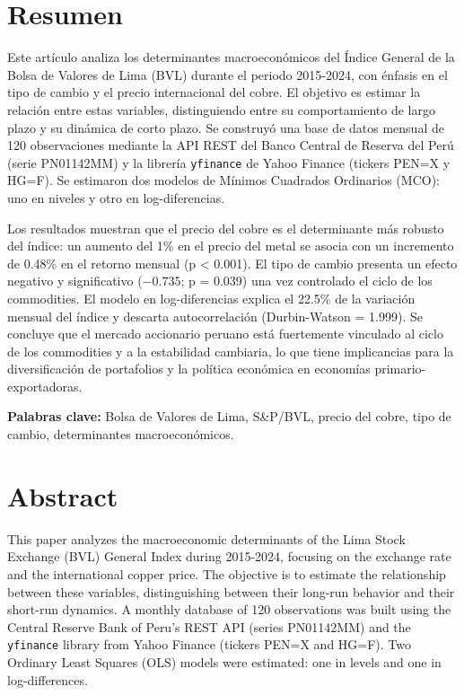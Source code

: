 \documentclass[12pt, a4paper]{article}
\begin{document}
\newpage
\section*{Resumen}

\noindent
Este artículo analiza los determinantes macroeconómicos del Índice General de la Bolsa de Valores de Lima (BVL) durante el periodo 2015-2024, con énfasis en el tipo de cambio y el precio internacional del cobre. El objetivo es estimar la relación entre estas variables, distinguiendo entre su comportamiento de largo plazo y su dinámica de corto plazo. Se construyó una base de datos mensual de 120 observaciones mediante la API REST del Banco Central de Reserva del Perú (serie PN01142MM) y la librería \texttt{yfinance} de Yahoo Finance (tickers PEN=X y HG=F). Se estimaron dos modelos de Mínimos Cuadrados Ordinarios (MCO): uno en niveles y otro en log-diferencias.

Los resultados muestran que el precio del cobre es el determinante más robusto del índice: un aumento del 1\% en el precio del metal se asocia con un incremento de 0.48\% en el retorno mensual (p < 0.001). El tipo de cambio presenta un efecto negativo y significativo ($-0.735$; p = 0.039) una vez controlado el ciclo de los commodities. El modelo en log-diferencias explica el 22.5\% de la variación mensual del índice y descarta autocorrelación (Durbin-Watson = 1.999). Se concluye que el mercado accionario peruano está fuertemente vinculado al ciclo de los commodities y a la estabilidad cambiaria, lo que tiene implicancias para la diversificación de portafolios y la política económica en economías primario-exportadoras.

\vspace{0.5cm}
\noindent\textbf{Palabras clave:} Bolsa de Valores de Lima, S\&P/BVL, precio del cobre, tipo de cambio, determinantes macroeconómicos.
\newpage
\section*{Abstract}

\noindent
This paper analyzes the macroeconomic determinants of the Lima Stock Exchange (BVL) General Index during 2015-2024, focusing on the exchange rate and the international copper price. The objective is to estimate the relationship between these variables, distinguishing between their long-run behavior and their short-run dynamics. A monthly database of 120 observations was built using the Central Reserve Bank of Peru's REST API (series PN01142MM) and the \texttt{yfinance} library from Yahoo Finance (tickers PEN=X and HG=F). Two Ordinary Least Squares (OLS) models were estimated: one in levels and one in log-differences.
\end{document}
